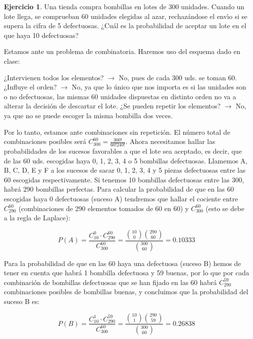 \documentclass[a4paper, 12pt]{article}
\theoremstyle{definition}
\newtheorem{ej}{Ejercicio}
\begin{document}
\begin{ej}
Una tienda compra bombillas en lotes de 300 unidades. Cuando un lote llega, se comprueban 60
unidades elegidas al azar, rechazándose el envı́o si se supera la cifra de 5 defectuosas. ¿Cuál es
la probabilidad de aceptar un lote en el que haya 10 defectuosas?

\medskip

Estamos ante un problema de combinatoria. Haremos uso del esquema dado en clase:

\medskip

¿Intervienen todos los elementos? $\longrightarrow$ No, pues de cada 300 uds. se toman 60.
\newline
¿Influye el orden? $\longrightarrow$ No, ya que lo único que nos importa es si las unidades son o no defectuosas, las mismas 60 unidades dispuestas en distinto orden no va a alterar la decisión de descartar el lote.
\newline
¿Se pueden repetir los elementos? $\longrightarrow$ No, ya que no se puede escoger la misma bombilla dos veces.

Por lo tanto, estamos ante combinaciones sin repetición. El número total de combinaciones posibles será $C_{300}^{60} = \frac{300!}{60!240!}$. Ahora necesitamos hallar las probabilidades de los sucesos favorables a que el lote sea aceptado, es decir, que de las 60 uds. escogidas haya 0, 1, 2, 3, 4 o 5 bombillas defectuosas. Llamemos A, B, C, D, E y F a los sucesos de sacar 0, 1, 2, 3, 4 y 5 piezas defectuosas entre las 60 escogidas respectivamente. Si tenemos 10 bombillas defectuosas entre las 300, habrá 290 bombillas perfectas. Para calcular la probabilidad de que en las 60 escogidas haya 0 defectuosas (suceso A) tendremos que hallar el cociente entre $C_{290}^{60}$ (combinaciones de 290 elementos tomados de 60 en 60) y $C_{300}^{60}$ (esto se debe a la regla de Laplace):

\[
    P(A) = \frac{C_{10}^{0} \cdot C_{290}^{60}}{C_{300}^{60}} = \frac{\binom{10}{0} \binom{290}{60}}{\binom{300}{60}} = 0.10333 
\]

Para la probabilidad de que en las 60 haya una defectuosa (suceso B) hemos de tener en cuenta que habrá 1 bombilla defectuosa y 59 buenas, por lo que por cada combinación de bombillas defectuosas que se han fijado en las 60 habrá $C_{290}^{59}$ combinaciones posibles de bombillas buenas, y concluimos que la probabilidad del suceso B es:

\[
    P(B) = \frac{C_{10}^{1} \cdot C_{290}^{59}}{C_{300}^{60}} = \frac{\binom{10}{1} \binom{290}{59}}{\binom{300}{60}} = 0.26838
\]


\end{ej}
\end{document}
